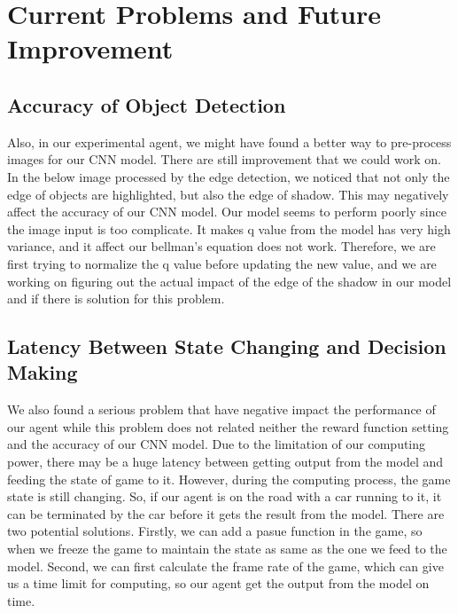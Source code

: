 \documentclass{article}
\begin{document}



\section{Current Problems and Future Improvement}

\subsection{Accuracy of Object Detection}
Also, in our experimental agent, we might have found a better way to pre-process images for our CNN model. There are still improvement that we could work on. In the below image processed by the edge detection, we noticed that not only the edge of objects are highlighted, but also the edge of shadow. This may negatively affect the accuracy of our CNN model. Our model seems to perform poorly since the image input is too complicate. It makes q value from the model has very high variance, and it affect our bellman's equation does not work. Therefore, we are first trying to normalize the q value before updating the new value, and we are working on figuring out the actual impact of the edge of the shadow in our model and if there is solution for this problem.

\subsection{Latency Between State Changing and Decision Making}
We also found a serious problem that have negative impact the performance of our agent while this problem does not related neither the reward function setting and the accuracy of our CNN model. Due to the limitation of our computing power, there may be a huge latency between getting output from the model and feeding the state of game to it. However, during the computing process, the game state is still changing. So, if our agent is on the road with a car running to it, it can be terminated by the car before it gets the result from the model. There are two potential solutions. Firstly, we can add a pasue function in the game, so when we freeze the game to maintain the state as same as the one we feed to the model. Second, we can first calculate the frame rate of the game, which can give us a time limit for computing, so our agent get the output from the model on time. 
\end{document}
